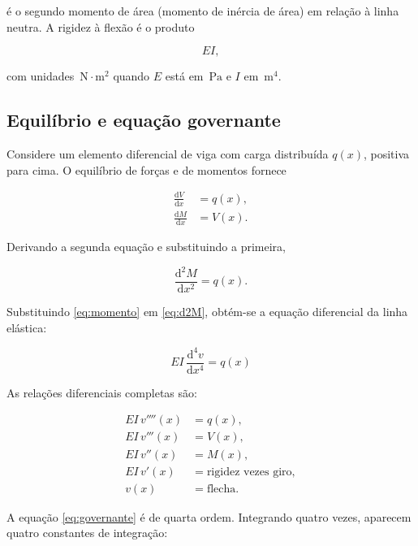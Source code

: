 \documentclass[12pt,a4paper]{article}
\newcommand{\unit}[1]{\,\mathrm{#1}}
\newcommand{\dd}{\mathrm{d}}
\begin{document}
é o segundo momento de área (momento de inércia de área) em relação à linha neutra. A rigidez à flexão é o produto

\begin{equation}
  EI,
  \label{eq:EI}
\end{equation}

com unidades \(\unit{N\cdot m^2}\) quando \(E\) está em \(\unit{Pa}\) e \(I\) em \(\unit{m^4}\).

\subsection{Equilíbrio e equação governante}

Considere um elemento diferencial de viga com carga distribuída \(q(x)\), positiva para cima. O equilíbrio de forças e de momentos fornece

\begin{align}
  \frac{\dd V}{\dd x} &= q(x), \label{eq:dV}\\
  \frac{\dd M}{\dd x} &= V(x). \label{eq:dM}
\end{align}

Derivando a segunda equação e substituindo a primeira,

\begin{equation}
  \frac{\dd^2 M}{\dd x^2} = q(x).
  \label{eq:d2M}
\end{equation}

Substituindo \eqref{eq:momento} em \eqref{eq:d2M}, obtém-se a equação diferencial da linha elástica:

\begin{equation}
  \boxed{EI\,\frac{\dd^4 v}{\dd x^4} = q(x)}
  \label{eq:governante}
\end{equation}

As relações diferenciais completas são:

\begin{align}
  EI\,v''''(x) &= q(x), \label{eq:governante2}\\
  EI\,v'''(x) &= V(x), \label{eq:V}\\
  EI\,v''(x) &= M(x), \label{eq:M}\\
  EI\,v'(x) &= \text{rigidez vezes giro}, \label{eq:giro}\\
  v(x) &= \text{flecha}. \label{eq:flecha}
\end{align}

A equação \eqref{eq:governante} é de quarta ordem. Integrando quatro vezes, aparecem quatro constantes de integração:
\end{document}
